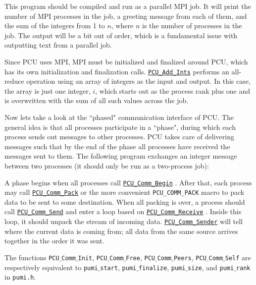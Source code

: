 \documentclass{article}
\begin{document}
This program should be compiled and run as a parallel MPI job.
It will print the number of MPI processes in the job, a greeting
message from each of them, and the sum of the integers from 1 to $n$,
where $n$ is the number of processes in the job.
The output will be a bit out of order, which is a fundamental issue
with outputting text from a parallel job.

Since PCU uses MPI, MPI must be initialized and finalized around
PCU, which has its own initialization and finalization calls.
\href{http://scorec.rpi.edu/~dibanez/core/pcu_8c.html#abf86ddf22cc114fd2bd3f054a067c225}{\texttt{PCU\_Add\_Ints}}
performs an all-reduce operation using
an array of integers as the input and output.
In this case, the array is just one integer, $i$, which starts
out as the process rank plus one and is overwritten with the sum
of all such values across the job.

Now lets take a look at the ``phased" communication interface of PCU.
The general idea is that all processes participate in a ``phase",
during which each process sends out messages to other processes.
PCU takes care of delivering messages such that by the end of
the phase all processes have received the messages sent to them.
The following program exchanges an integer message between two
processes (it should only be run as a two-process job):



A phase begins when all processes call
\href{http://scorec.rpi.edu/~dibanez/core/pcu_8c.html#aa1821bf79d880c38cdd91515751799ac}{\texttt{PCU\_Comm\_Begin}}
.
After that, each process may call
\href{http://scorec.rpi.edu/~dibanez/core/pcu_8c.html#afd8a6600d960129089c45fd49c1b2311}{\texttt{PCU\_Comm\_Pack}}
or the more convenient
\texttt{PCU\_COMM\_PACK}
macro to pack data to be sent to some destination.
When all packing is over, a process should call
\href{http://scorec.rpi.edu/~dibanez/core/pcu_8c.html#a263061f00174fc7a004dcb198778006c}{\texttt{PCU\_Comm\_Send}}
and enter a loop based on
\href{http://scorec.rpi.edu/~dibanez/core/pcu_8c.html#ad02bc960bcfa8e2d6b09458dca38bf53}{\texttt{PCU\_Comm\_Receive}}
.
Inside this loop, it should unpack the stream of incoming data.
\href{http://scorec.rpi.edu/~dibanez/core/pcu_8c.html#ac4577ded2ec61de4b4141e3353aac440}{\texttt{PCU\_Comm\_Sender}}
will tell where the current data is coming
from; all data from the same source arrives together in the
order it was sent.

The functions \texttt{PCU$\_$Comm$\_$Init}, \texttt{PCU$\_$Comm$\_$Free},
\texttt{PCU$\_$Comm$\_$Peers}, \texttt{PCU$\_$Comm$\_$Self} are respectively
equivalent to \texttt{pumi$\_$start}, \texttt{pumi$\_$finalize},
\texttt{pumi$\_$size}, and \texttt{pumi$\_$rank} in \texttt{pumi.h}.
\end{document}
